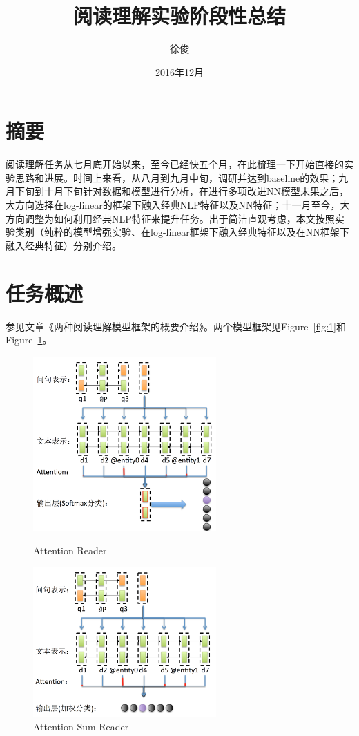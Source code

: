 \documentclass[11pt]{article}
\title{阅读理解实验阶段性总结}
\author{徐俊}
\date{2016年12月}
\begin{document}
\maketitle
\tableofcontents

\section{摘要}
阅读理解任务从七月底开始以来，至今已经快五个月，在此梳理一下开始直接的实验思路和进展。时间上来看，从八月到九月中旬，调研并达到baseline的效果；九月下旬到十月下旬针对数据和模型进行分析，在进行多项改进NN模型未果之后，大方向选择在log-linear的框架下融入经典NLP特征以及NN特征；十一月至今，大方向调整为如何利用经典NLP特征来提升任务。出于简洁直观考虑，本文按照实验类别（纯粹的模型增强实验、在log-linear框架下融入经典特征以及在NN框架下融入经典特征）分别介绍。

\section{任务概述}
参见文章《两种阅读理解模型框架的概要介绍》。两个模型框架见Figure~\ref{fig:1}和Figure~\ref{fig:2}。

\begin{figure}[htbp]
\centering
\begin{minipage}[t]{0.45\textwidth}
\centering
\includegraphics[width=70mm]{picture/attentionreader.png}
\caption{Attention Reader}
\label{fig:1}
\end{minipage}
\begin{minipage}[t]{0.45\textwidth}
\centering
\includegraphics[width=70mm]{picture/attensumreader.png}
\caption{Attention-Sum Reader}
\label{fig:2}
\end{minipage}
\end{figure}
\end{document}
